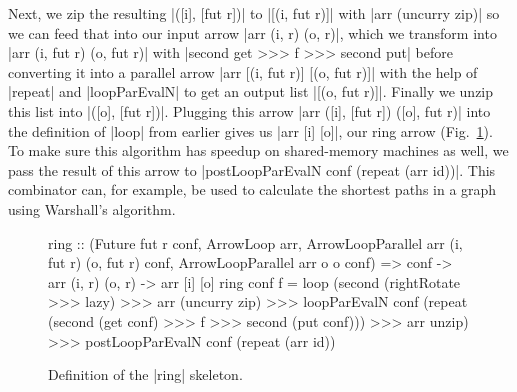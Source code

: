 Next, we zip the resulting |([i], [fut r])| to |[(i, fut r)]| with |arr (uncurry zip)| so we can feed that into our input arrow |arr (i, r) (o, r)|, which we transform into |arr (i, fut r) (o, fut r)| with |second get >>> f >>> second put| before converting it into a parallel arrow |arr [(i, fut r)] [(o, fut r)]| with the help of |repeat| and |loopParEvalN| to get an output list |[(o, fut r)]|. Finally we unzip this list into |([o], [fut r])|. Plugging this arrow |arr ([i], [fut r]) ([o], fut r)| into the definition of |loop| from earlier gives us |arr [i] [o]|, our ring arrow (Fig.~\ref{fig:ringFinal}). To make sure this algorithm has speedup on shared-memory machines as well, we pass the result of this arrow to |postLoopParEvalN conf (repeat (arr id))|.
This combinator can, for example, be used to calculate the shortest paths in a graph using Warshall's algorithm.

\begin{figure}[tb]
\begin{code}
ring :: (Future fut r conf,
    ArrowLoop arr,
    ArrowLoopParallel arr (i, fut r) (o, fut r) conf,
    ArrowLoopParallel arr o o conf) =>
    conf -> arr (i, r) (o, r) -> arr [i] [o]
ring conf f =
    loop (second (rightRotate >>> lazy) >>>
        arr (uncurry zip) >>>
        loopParEvalN conf (repeat (second (get conf) >>> f >>> second (put conf))) >>>
        arr unzip) >>>
    postLoopParEvalN conf (repeat (arr id))
\end{code}
\caption{Definition of the |ring| skeleton.}
\label{fig:ringFinal}
\end{figure}

